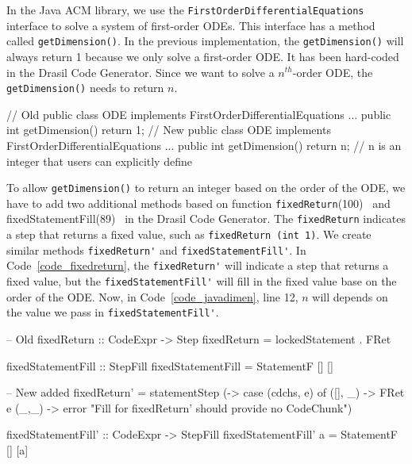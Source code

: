 In the Java ACM library, we use the \verb|FirstOrderDifferentialEquations| interface to solve a system of first-order ODEs. This interface has a method called \verb|getDimension()|. In the previous implementation, the \verb|getDimension()| will always return 1 because we only solve a first-order ODE. It has been hard-coded in the Drasil Code Generator. Since we want to solve a $n^{th}$-order ODE, the \verb|getDimension()| needs to return $n$.

\begin{listing}
\begin{java1}
// Old 
public class ODE implements FirstOrderDifferentialEquations {
  ...
  public int getDimension() {
    return 1;
  }
}
// New 
public class ODE implements FirstOrderDifferentialEquations {
  ...
  public int getDimension() {
    return n; // n is an integer that users can explicitly define
  }
}
\end{java1}
\label{code_javadimen}
\end{listing}

To allow \verb|getDimension()| to return an integer based on the order of the ODE, we have to add two additional methods based on function \verb|fixedReturn|(100)~\citep{brooks} and fixedStatementFill(89)~\citep{brooks} in the Drasil Code Generator. The \verb|fixedReturn| indicates a step that returns a fixed value, such as \verb|fixedReturn (int 1)|. We create similar methods \verb|fixedReturn'| and \verb|fixedStatementFill'|. In Code~\ref{code_fixedreturn}, the \verb|fixedReturn'| will indicate a step that returns a fixed value, but the \verb|fixedStatementFill'| will fill in the fixed value base on the order of the ODE. Now, in Code~\ref{code_javadimen}, line 12, $n$ will depends on the value we pass in \verb|fixedStatementFill'|.

\begin{listing}
\begin{haskell1}
-- Old 
fixedReturn :: CodeExpr -> Step
fixedReturn = lockedStatement . FRet

fixedStatementFill :: StepFill
fixedStatementFill = StatementF [] []

-- New added 
fixedReturn' = statementStep (\cdchs [e] -> case (cdchs, e) of
  ([], _) -> FRet e
  (_,_) -> error "Fill for fixedReturn' should provide no CodeChunk")

fixedStatementFill' :: CodeExpr -> StepFill
fixedStatementFill' a = StatementF [] [a]
\end{haskell1}
\label{code_fixedreturn}
\end{listing}

